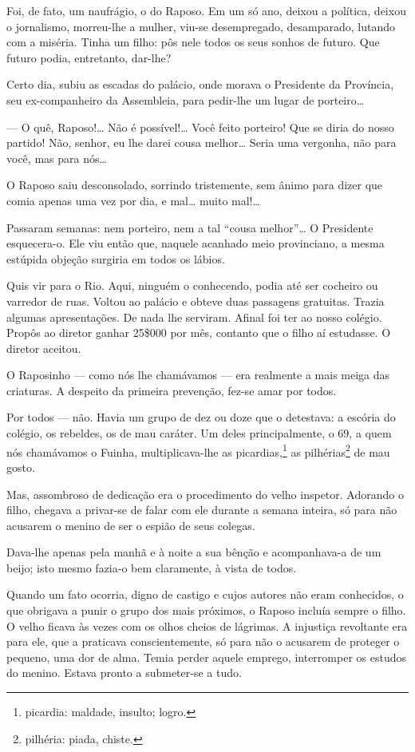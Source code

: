 Foi, de fato, um naufrágio, o do Raposo. Em um só ano, deixou a
política, deixou o jornalismo, morreu-lhe a mulher, viu-se desempregado,
desamparado, lutando com a miséria. Tinha um filho: pôs nele todos os
seus sonhos de futuro. Que futuro podia, entretanto, dar-lhe?

Certo dia, subiu as escadas do palácio, onde morava o Presidente da
Província, seu ex-companheiro da Assembleia, para pedir-lhe um lugar de
porteiro\ldots{}

--- O quê, Raposo!\ldots{} Não é possível!\ldots{} Você feito porteiro! Que se
diria do nosso partido! Não, senhor, eu lhe darei cousa melhor\ldots{} Seria
uma vergonha, não para você, mas para nós\ldots{}

O Raposo saiu desconsolado, sorrindo tristemente, sem ânimo para dizer
que comia apenas uma vez por dia, e mal\ldots{} muito mal!\ldots{}

Passaram semanas: nem porteiro, nem a tal ``cousa melhor''\ldots{} O
Presidente esquecera-o. Ele viu então que, naquele acanhado meio
provinciano, a mesma estúpida objeção surgiria em todos os lábios.

Quis vir para o Rio. Aqui, ninguém o conhecendo, podia até ser cocheiro
ou varredor de ruas. Voltou ao palácio e obteve duas passagens
gratuitas. Trazia algumas apresentações. De nada lhe serviram. Afinal
foi ter ao nosso colégio. Propôs ao diretor ganhar 25\$000 por mês,
contanto que o filho aí estudasse. O diretor aceitou.

O Raposinho --- como nós lhe chamávamos --- era realmente a mais meiga
das criaturas. A despeito da primeira prevenção, fez-se amar por todos.

Por todos --- não. Havia um grupo de dez ou doze que o detestava: a
escória do colégio, os rebeldes, os de mau caráter. Um deles
principalmente, o 69, a quem nós chamávamos o Fuinha, multiplicava-lhe
as picardias,\footnote{picardia: maldade, insulto; logro.} as
pilhérias\footnote{pilhéria: piada, chiste.} de mau gosto.

Mas, assombroso de dedicação era o procedimento do velho inspetor.
Adorando o filho, chegava a privar-se de falar com ele durante a semana
inteira, só para não acusarem o menino de ser o espião de seus colegas.

Dava-lhe apenas pela manhã e à noite a sua bênção e acompanhava-a de um
beijo; isto mesmo fazia-o bem claramente, à vista de todos.

Quando um fato ocorria, digno de castigo e cujos autores não eram
conhecidos, o que obrigava a punir o grupo dos mais próximos, o Raposo
incluía sempre o filho. O velho ficava às vezes com os olhos cheios de
lágrimas. A injustiça revoltante era para ele, que a praticava
conscientemente, só para não o acusarem de proteger o pequeno, uma dor
de alma. Temia perder aquele emprego, interromper os estudos do menino.
Estava pronto a submeter-se a tudo.

